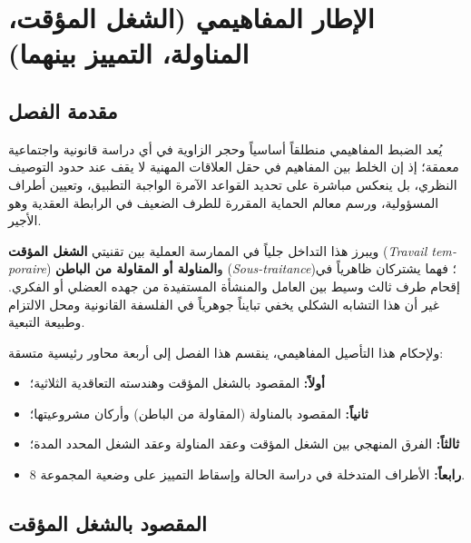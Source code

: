 
\chapter{الإطار المفاهيمي (الشغل المؤقت، المناولة، التمييز بينهما)}
\label{chap:chapitre1}

\section*{مقدمة الفصل}

يُعد الضبط المفاهيمي منطلقاً أساسياً وحجر الزاوية في أي دراسة قانونية واجتماعية معمقة؛ إذ إن الخلط بين المفاهيم في حقل العلاقات المهنية لا يقف عند حدود التوصيف النظري، بل ينعكس مباشرة على تحديد القواعد الآمرة الواجبة التطبيق، وتعيين أطراف المسؤولية، ورسم معالم الحماية المقررة للطرف الضعيف في الرابطة العقدية وهو الأجير.

ويبرز هذا التداخل جلياً في الممارسة العملية بين تقنيتي \textbf{الشغل المؤقت} (\textfrench{\textit{Travail temporaire}}) و\textbf{المناولة أو المقاولة من الباطن} (\textfrench{\textit{Sous-traitance}})؛ فهما يشتركان ظاهرياً في إقحام طرف ثالث وسيط بين العامل والمنشأة المستفيدة من جهده العضلي أو الفكري. غير أن هذا التشابه الشكلي يخفي تبايناً جوهرياً في الفلسفة القانونية ومحل الالتزام وطبيعة التبعية.

ولإحكام هذا التأصيل المفاهيمي، ينقسم هذا الفصل إلى أربعة محاور رئيسية متسقة:
\begin{itemize}[leftmargin=*, itemsep=4pt]
    \item \textbf{أولاً:} المقصود بالشغل المؤقت وهندسته التعاقدية الثلاثية؛
    \item \textbf{ثانياً:} المقصود بالمناولة (المقاولة من الباطن) وأركان مشروعيتها؛
    \item \textbf{ثالثاً:} الفرق المنهجي بين الشغل المؤقت وعقد المناولة وعقد الشغل المحدد المدة؛
    \item \textbf{رابعاً:} الأطراف المتدخلة في دراسة الحالة وإسقاط التمييز على وضعية المجموعة \textenglish{8}.
\end{itemize}

\section{المقصود بالشغل المؤقت}

